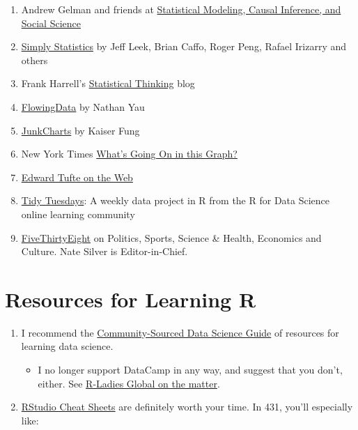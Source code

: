 \documentclass[
]{book}
\providecommand{\tightlist}{%
  \setlength{\itemsep}{0pt}\setlength{\parskip}{0pt}}
\begin{document}
\begin{enumerate}
\def\labelenumi{\arabic{enumi}.}
\tightlist
\item
  Andrew Gelman and friends at \href{https://statmodeling.stat.columbia.edu/}{Statistical Modeling, Causal Inference, and Social Science}
\item
  \href{https://simplystatistics.org/}{Simply Statistics} by Jeff Leek, Brian Caffo, Roger Peng, Rafael Irizarry and others
\item
  Frank Harrell's \href{https://www.fharrell.com/}{Statistical Thinking} blog
\item
  \href{https://flowingdata.com/}{FlowingData} by Nathan Yau
\item
  \href{https://junkcharts.typepad.com/}{JunkCharts} by Kaiser Fung
\item
  New York Times \href{https://www.nytimes.com/column/whats-going-on-in-this-graph}{What's Going On in this Graph?}
\item
  \href{https://www.edwardtufte.com/tufte/}{Edward Tufte on the Web}
\item
  \href{https://github.com/rfordatascience/tidytuesday}{Tidy Tuesdays}: A weekly data project in R from the R for Data Science online learning community
\item
  \href{https://fivethirtyeight.com/}{FiveThirtyEight} on Politics, Sports, Science \& Health, Economics and Culture. Nate Silver is Editor-in-Chief.
\end{enumerate}

\hypertarget{resources-for-learning-r}{%
\section{Resources for Learning R}\label{resources-for-learning-r}}

\begin{enumerate}
\def\labelenumi{\arabic{enumi}.}
\tightlist
\item
  I recommend the \href{https://github.com/Chris-Engelhardt/data_sci_guide}{Community-Sourced Data Science Guide} of resources for learning data science.

  \begin{itemize}
  \tightlist
  \item
    I no longer support DataCamp in any way, and suggest that you don't, either. See \href{https://blog.rladies.org/post/statement-about-datacamp/}{R-Ladies Global on the matter}.
  \end{itemize}
\item
  \href{https://www.rstudio.com/resources/cheatsheets/}{RStudio Cheat Sheets} are definitely worth your time. In 431, you'll especially like:
\end{enumerate}
\end{document}
